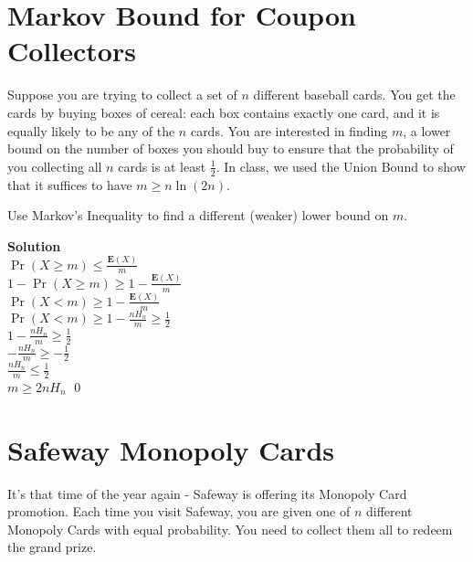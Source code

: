 \documentclass[11pt]{article}
\newcommand*{\Question}[1]{\section{#1}}
\newenvironment{Answer}{\vspace{10pt}\begin{mdframed}\textbf{Solution}\\}{\end{mdframed}\vfill\pagebreak[3]}
\newenvironment{Answer}{\vspace{10pt}}{\vfill\pagebreak[3]}
\newcommand*{\E}{\textbf{E}}
\begin{document}
\Question{Markov Bound for Coupon Collectors} 
Suppose you are trying to collect a set of $n$ different baseball cards. You get the cards by buying boxes of cereal: each box contains exactly one card, and it is equally likely to be any of the $n$ cards. You are interested in finding $m$, a lower bound on the number of boxes you should buy to ensure that the probability of you collecting all $n$ cards is at least $\frac{1}{2}$. In class, we used the Union Bound to show that it suffices to have $m \geq n \ln (2n)$.

Use Markov's Inequality to find a different (weaker) lower bound on $m$.

\begin{Answer}
$\Pr(X \geq m) \leq \frac{\E(X)}{m}$\\
$1-\Pr(X \geq m) \geq 1-\frac{\E(X)}{m}$\\
$\Pr(X<m) \geq 1 - \frac{\E(X)}{m}$\\
$\Pr(X<m) \geq 1 - \frac{nH_n}{m} \geq \frac{1}{2}$\\
$1 - \frac{nH_n}{m} \geq \frac{1}{2}$\\
$-\frac{nH_n}{m} \geq -\frac{1}{2}$\\
$\frac{nH_n}{m} \leq \frac{1}{2}$\\
$m \geq 2nH_n$ \qed
\end{Answer}

\Question{Safeway Monopoly Cards} 
It's that time of the year again - Safeway is offering its Monopoly Card promotion. Each time you visit Safeway, you are given one of $n$ different Monopoly Cards with equal probability. You need to collect them all to redeem the grand prize.
\end{document}
